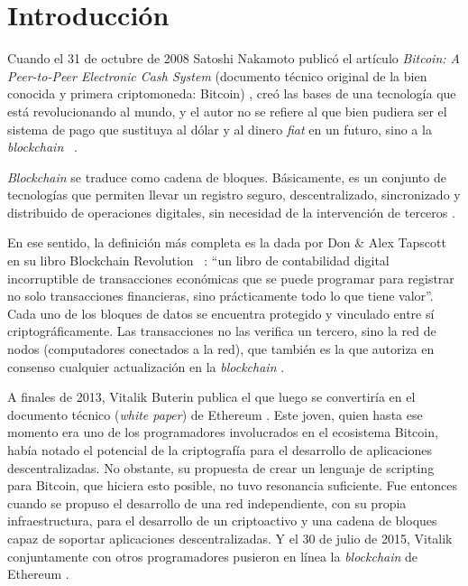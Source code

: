 \chapter*{Introducción}\label{chapter:introduction}


  Cuando el 31 de octubre de 2008 Satoshi Nakamoto publicó el artículo \textit{Bitcoin: A Peer-to-Peer Electronic Cash System} (documento 
  técnico original de la bien conocida y primera criptomoneda: Bitcoin) , creó las bases de una tecnología que 
  está revolucionando al mundo, y el autor no se refiere al que bien pudiera ser el sistema de pago que sustituya al dólar y al dinero 
  \textit{fiat} en un futuro, sino a la \textit{blockchain} ~\parencite{satoshi2008}.
  
  \textit{Blockchain} se traduce como cadena de bloques. Básicamente, es un conjunto de tecnologías que permiten llevar un registro 
  seguro, descentralizado, sincronizado y distribuido de operaciones digitales, sin necesidad de la intervención de terceros 
  \parencite{solunion2021}.

  En ese sentido, la definición más completa es la dada por Don \& Alex Tapscott en su libro Blockchain Revolution
  ~\parencite{tapscott2016blockchain}: “un libro de 
  contabilidad digital incorruptible de transacciones económicas que se puede programar para registrar no solo transacciones financieras, 
  sino prácticamente todo lo que tiene valor”. Cada uno de los bloques de datos se encuentra protegido y vinculado entre sí 
  criptográficamente. Las transacciones no las verifica un tercero, sino la red 
  de nodos (computadores conectados a la red), que también es la que autoriza en consenso cualquier actualización en la \textit{blockchain} 
  \parencite{solunion2021}.

  A finales de 2013, Vitalik Buterin publica el que luego se convertiría en el documento técnico (\textit{white paper}) de Ethereum 
  \parencite{buterin2013}. Este joven, quien hasta ese momento era uno de los
  programadores involucrados en el ecosistema Bitcoin, había notado el potencial de la criptografía para el desarrollo de aplicaciones 
  descentralizadas. No obstante, su propuesta de crear un lenguaje de scripting para Bitcoin, que hiciera esto posible, no tuvo resonancia 
  suficiente. Fue entonces cuando se propuso el desarrollo de una red independiente, con su propia infraestructura, para el desarrollo de 
  un criptoactivo y una cadena de bloques capaz de soportar aplicaciones descentralizadas. Y el 30 de julio de 2015, Vitalik conjuntamente
  con otros programadores pusieron en línea la \textit{blockchain} de Ethereum \parencite{diaz2018}. 
  
